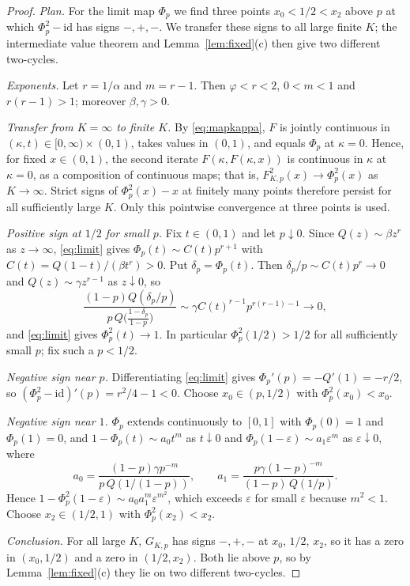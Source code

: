 \documentclass[11pt,a4paper]{article}
\theoremstyle{plain}
\theoremstyle{definition}
\begin{document}
\begin{proof}
\emph{Plan.} For the limit map $\Phi_p$ we find three points $x_0<1/2<x_2$ above $p$ at which $\Phi_p^2-\mathrm{id}$ has signs $-,+,-$. We transfer these signs to all large finite $K$; the intermediate value theorem and Lemma~\ref{lem:fixed}(c) then give two different two-cycles.

\emph{Exponents.} Let $r=1/\alpha$ and $m=r-1$. Then $\varphi<r<2$, $0<m<1$ and $r(r-1)>1$; moreover $\beta,\gamma>0$.

\emph{Transfer from $K=\infty$ to finite $K$.} By \eqref{eq:mapkappa}, $F$ is jointly continuous in $(\kappa,t)\in[0,\infty)\times(0,1)$, takes values in $(0,1)$, and equals $\Phi_p$ at $\kappa=0$. Hence, for fixed $x\in(0,1)$, the second iterate $F(\kappa,F(\kappa,x))$ is continuous in $\kappa$ at $\kappa=0$, as a composition of continuous maps; that is, $F^2_{K,p}(x)\to\Phi_p^2(x)$ as $K\to\infty$. Strict signs of $\Phi_p^2(x)-x$ at finitely many points therefore persist for all sufficiently large $K$. Only this pointwise convergence at three points is used.

\emph{Positive sign at $1/2$ for small $p$.} Fix $t\in(0,1)$ and let $p\downarrow0$. Since $Q(z)\sim\beta z^r$ as $z\to\infty$, \eqref{eq:limit} gives $\Phi_p(t)\sim C(t)p^{r+1}$ with $C(t)=Q(1-t)/(\beta t^r)>0$. Put $\delta_p=\Phi_p(t)$. Then $\delta_p/p\sim C(t)p^r\to0$ and $Q(z)\sim\gamma z^{r-1}$ as $z\downarrow0$, so
\[
 \frac{(1-p)Q(\delta_p/p)}{p\,Q\bigl(\frac{1-\delta_p}{1-p}\bigr)}\sim\gamma C(t)^{r-1}p^{r(r-1)-1}\to0,
\]
and \eqref{eq:limit} gives $\Phi_p^2(t)\to1$. In particular $\Phi_p^2(1/2)>1/2$ for all sufficiently small $p$; fix such a $p<1/2$.

\emph{Negative sign near $p$.} Differentiating \eqref{eq:limit} gives $\Phi_p'(p)=-Q'(1)=-r/2$, so $(\Phi^2_p-\mathrm{id})'(p)=r^2/4-1<0$. Choose $x_0\in(p,1/2)$ with $\Phi_p^2(x_0)<x_0$.

\emph{Negative sign near $1$.} $\Phi_p$ extends continuously to $[0,1]$ with $\Phi_p(0)=1$ and $\Phi_p(1)=0$, and
$1-\Phi_p(t)\sim a_0t^m$ as $t\downarrow0$ and $\Phi_p(1-\varepsilon)\sim a_1\varepsilon^m$ as $\varepsilon\downarrow0$, where
\[
 a_0=\frac{(1-p)\gamma p^{-m}}{p\,Q(1/(1-p))},\qquad a_1=\frac{p\gamma(1-p)^{-m}}{(1-p)\,Q(1/p)}.
\] Hence $1-\Phi_p^2(1-\varepsilon)\sim a_0a_1^m\varepsilon^{m^2}$, which exceeds $\varepsilon$ for small $\varepsilon$ because $m^2<1$. Choose $x_2\in(1/2,1)$ with $\Phi_p^2(x_2)<x_2$.

\emph{Conclusion.} For all large $K$, $G_{K,p}$ has signs $-,+,-$ at $x_0$, $1/2$, $x_2$, so it has a zero in $(x_0,1/2)$ and a zero in $(1/2,x_2)$. Both lie above $p$, so by Lemma~\ref{lem:fixed}(c) they lie on two different two-cycles.
\end{proof}
\end{document}
